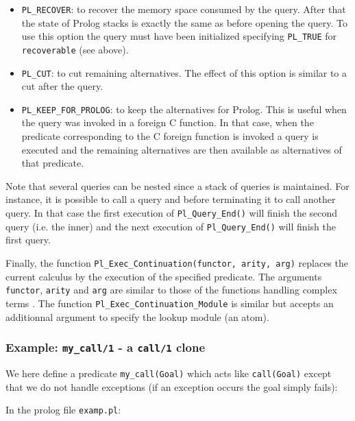 \begin{itemize}

\item \texttt{PL\_RECOVER}: to recover the memory space consumed by the
query. After that the state of Prolog stacks is exactly the same as before
opening the query. To use this option the query must have been initialized
specifying \texttt{PL\_TRUE} for \texttt{recoverable} (see above).

\item \texttt{PL\_CUT}: to cut remaining alternatives. The effect of this
option is similar to a cut after the query.

\item \texttt{PL\_KEEP\_FOR\_PROLOG}: to keep the alternatives for Prolog.
This is useful when the query was invoked in a foreign C function. In that
case, when the predicate corresponding to the C foreign function is invoked
a query is executed and the remaining alternatives are then available as
alternatives of that predicate.

\end{itemize}

Note that several queries can be nested since a stack of queries is
maintained. For instance, it is possible to call a query and before
terminating it to call another query. In that case the first execution of
\texttt{Pl\_Query\_End()} will finish the second query (i.e. the inner) and
the next execution of \texttt{Pl\_Query\_End()} will finish the first query.

Finally, the function \texttt{Pl\_Exec\_Continuation(functor, arity, arg)}
replaces the current calculus by the execution of the specified
predicate. The arguments \texttt{functor}, \texttt{arity} and \texttt{arg}
are similar to those of the functions handling complex terms
. The function
\texttt{Pl\_Exec\_Continuation\_Module} is similar but accepts an additionnal
argument to specify the lookup module (an atom).

\subsubsection{Example: \texttt{my\_call/1} - a \texttt{call/1} clone}

We here define a predicate \texttt{my\_call(Goal)} which acts like
\texttt{call(Goal)} except that we do not handle exceptions (if an exception
occurs the goal simply fails):

In the prolog file \texttt{examp.pl}:

